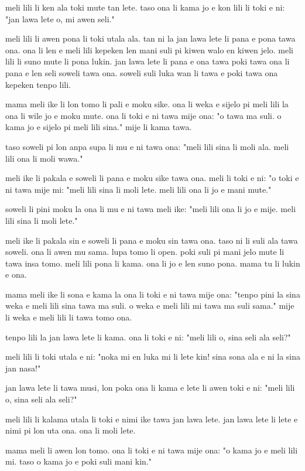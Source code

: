 meli lili li ken ala toki mute tan lete.
taso ona li kama jo e kon lili li toki e ni:
"jan lawa lete o, mi awen seli."

meli lili li awen pona li toki utala ala.
tan ni la jan lawa lete li pana e pona tawa ona.
ona li len e meli lili kepeken len mani suli pi kiwen walo en kiwen jelo.
meli lili li suno mute li pona lukin.
jan lawa lete li pana e ona tawa poki tawa ona li pana e len seli soweli tawa ona.
soweli suli luka wan li tawa e poki tawa ona kepeken tenpo lili.

mama meli ike li lon tomo li pali e moku sike.
ona li weka e sijelo pi meli lili la ona li wile jo e moku mute.
ona li toki e ni tawa mije ona:
"o tawa ma suli.
o kama jo e sijelo pi meli lili sina."
mije li kama tawa.

taso soweli pi lon anpa supa li mu e ni tawa ona:
"meli lili sina li moli ala.
meli lili ona li moli wawa."

meli ike li pakala e soweli li pana e moku sike tawa ona.
meli li toki e ni:
"o toki e ni tawa mije mi:
"meli lili sina li moli lete.
meli lili ona li jo e mani mute."

soweli li pini moku la ona li mu e ni tawa meli ike:
"meli lili ona li jo e mije.
meli lili sina li moli lete."

meli ike li pakala sin e soweli li pana e moku sin tawa ona.
taso ni li suli ala tawa soweli.
ona li awen mu sama.
lupa tomo li open.
poki suli pi mani jelo mute li tawa insa tomo.
meli lili pona li kama.
ona li jo e len suno pona.
mama tu li lukin e ona.

mama meli ike li sona e kama la ona li toki e ni tawa mije ona:
"tenpo pini la sina weka e meli lili sina tawa ma suli.
o weka e meli lili mi tawa ma suli sama."
mije li weka e meli lili li tawa tomo ona.

tenpo lili la jan lawa lete li kama.
ona li toki e ni:
"meli lili o, sina seli ala seli?"

meli lili li toki utala e ni:
"noka mi en luka mi li lete kin!
sina sona ala e ni la sina jan nasa!"

jan lawa lete li tawa musi, lon poka ona li kama e lete li awen toki e ni:
"meli lili o, sina seli ala seli?"

meli lili li kalama utala li toki e nimi ike tawa jan lawa lete.
jan lawa lete li lete e nimi pi lon uta ona.
ona li moli lete.

mama meli li awen lon tomo.
ona li toki e ni tawa mije ona:
"o kama jo e meli lili mi.
taso o kama jo e poki suli mani kin."

